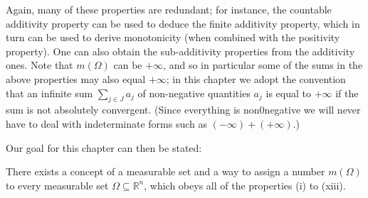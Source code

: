 Again, many of these properties are redundant; for instance, the countable additivity property can be used to deduce the finite additivity property, which in turn can be used to derive monotonicity (when combined with the positivity property). One can also obtain the sub-additivity properties from the additivity ones. Note that \(m(\Omega )\) can be \(+ \infty \), and so in particular some of the sums in the above properties may also equal \(+\infty \); in this chapter we adopt the convention that an infinite sum \(\sum_{j \in J} a_j \) of non-negative quantities \(a_j\) is equal to \(+ \infty \) if the sum is not absolutely convergent. (Since everything is non0negative we will never have to deal with indeterminate forms such as \((- \infty) + (+ \infty ) \).)

Our goal for this chapter can then be stated:

\begin{theorem}
    There exists a concept of a measurable set and a way to assign a number \(m(\Omega )\) to every measurable set \(\Omega \subseteq \mathbb{R} ^n\), which obeys all of the properties (i) to (xiii).  
\end{theorem}